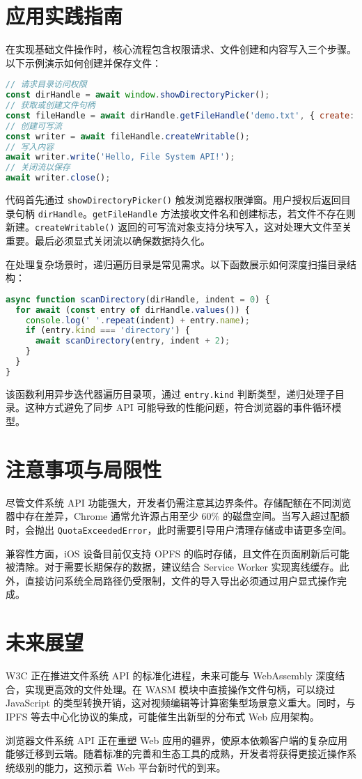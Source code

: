\chapter{应用实践指南}
在实现基础文件操作时，核心流程包含权限请求、文件创建和内容写入三个步骤。以下示例演示如何创建并保存文件：\par
\begin{lstlisting}[language=javascript]
// 请求目录访问权限
const dirHandle = await window.showDirectoryPicker();
// 获取或创建文件句柄
const fileHandle = await dirHandle.getFileHandle('demo.txt', { create: true });
// 创建可写流
const writer = await fileHandle.createWritable();
// 写入内容
await writer.write('Hello, File System API!');
// 关闭流以保存
await writer.close();
\end{lstlisting}
代码首先通过 \verb!showDirectoryPicker()! 触发浏览器权限弹窗。用户授权后返回目录句柄 \verb!dirHandle!。\verb!getFileHandle! 方法接收文件名和创建标志，若文件不存在则新建。\verb!createWritable()! 返回的可写流对象支持分块写入，这对处理大文件至关重要。最后必须显式关闭流以确保数据持久化。\par
在处理复杂场景时，递归遍历目录是常见需求。以下函数展示如何深度扫描目录结构：\par
\begin{lstlisting}[language=javascript]
async function scanDirectory(dirHandle, indent = 0) {
  for await (const entry of dirHandle.values()) {
    console.log(' '.repeat(indent) + entry.name);
    if (entry.kind === 'directory') {
      await scanDirectory(entry, indent + 2);
    }
  }
}
\end{lstlisting}
该函数利用异步迭代器遍历目录项，通过 \verb!entry.kind! 判断类型，递归处理子目录。这种方式避免了同步 API 可能导致的性能问题，符合浏览器的事件循环模型。\par
\chapter{注意事项与局限性}
尽管文件系统 API 功能强大，开发者仍需注意其边界条件。存储配额在不同浏览器中存在差异，Chrome 通常允许源占用至少 60\%{} 的磁盘空间。当写入超过配额时，会抛出 \verb!QuotaExceededError!，此时需要引导用户清理存储或申请更多空间。\par
兼容性方面，iOS 设备目前仅支持 OPFS 的临时存储，且文件在页面刷新后可能被清除。对于需要长期保存的数据，建议结合 Service Worker 实现离线缓存。此外，直接访问系统全局路径仍受限制，文件的导入导出必须通过用户显式操作完成。\par
\chapter{未来展望}
W3C 正在推进文件系统 API 的标准化进程，未来可能与 WebAssembly 深度结合，实现更高效的文件处理。在 WASM 模块中直接操作文件句柄，可以绕过 JavaScript 的类型转换开销，这对视频编辑等计算密集型场景意义重大。同时，与 IPFS 等去中心化协议的集成，可能催生出新型的分布式 Web 应用架构。\par
浏览器文件系统 API 正在重塑 Web 应用的疆界，使原本依赖客户端的复杂应用能够迁移到云端。随着标准的完善和生态工具的成熟，开发者将获得更接近操作系统级别的能力，这预示着 Web 平台新时代的到来。\par
